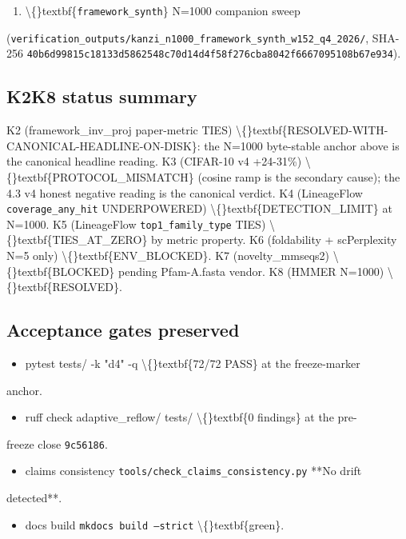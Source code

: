 \documentclass[preprint,3p,times,twocolumn]{elsarticle}
\begin{document}
\begin{enumerate}
\item \textbackslash\{\}textbf\{\texttt{framework\_synth}\}  N=1000 companion sweep
\end{enumerate}
(\texttt{verification\_outputs/kanzi\_n1000\_framework\_synth\_w152\_q4\_2026/}, SHA-256 \texttt{40b6d99815c18133d5862548c70d14d4f58f276cba8042f6667095108b67e934}).

\subsection{K2K8 status summary}
K2 (framework\_inv\_proj paper-metric TIES)  \textbackslash\{\}textbf\{RESOLVED-WITH-CANONICAL-HEADLINE-ON-DISK\}: the N=1000 byte-stable anchor above is the canonical headline reading. K3 (CIFAR-10 v4 +24-31\%)  \textbackslash\{\}textbf\{PROTOCOL\_MISMATCH\} (cosine ramp is the secondary cause); the 4.3 v4 honest negative reading is the canonical verdict. K4 (LineageFlow \texttt{coverage\_any\_hit} UNDERPOWERED)  \textbackslash\{\}textbf\{DETECTION\_LIMIT\} at N=1000. K5 (LineageFlow \texttt{top1\_family\_type} TIES)  \textbackslash\{\}textbf\{TIES\_AT\_ZERO\} by metric property. K6 (foldability + scPerplexity N=5 only)  \textbackslash\{\}textbf\{ENV\_BLOCKED\}. K7 (novelty\_mmseqs2)  \textbackslash\{\}textbf\{BLOCKED\} pending Pfam-A.fasta vendor. K8 (HMMER N=1000)  \textbackslash\{\}textbf\{RESOLVED\}.

\subsection{Acceptance gates preserved}
\begin{itemize}
\item pytest tests/ -k "d4" -q  \textbackslash\{\}textbf\{72/72 PASS\} at the freeze-marker
\end{itemize}
anchor.

\begin{itemize}
\item ruff check adaptive\_reflow/ tests/  \textbackslash\{\}textbf\{0 findings\} at the pre-
\end{itemize}
freeze close \texttt{9c56186}.

\begin{itemize}
\item claims consistency \texttt{tools/check\_claims\_consistency.py}  **No drift
\end{itemize}
detected**.

\begin{itemize}
\item docs build \texttt{mkdocs build --strict}  \textbackslash\{\}textbf\{green\}.
\end{itemize}
\end{document}
